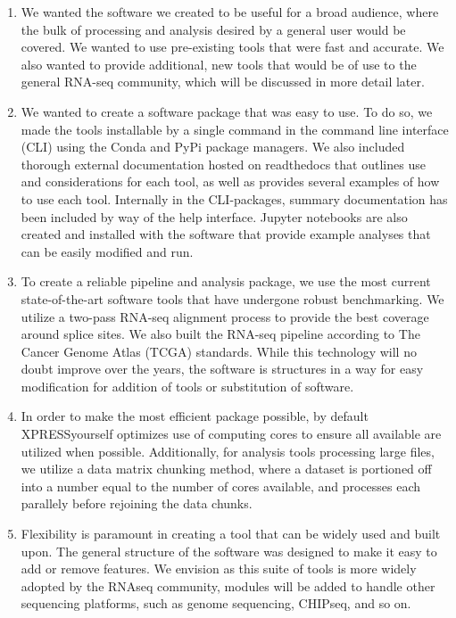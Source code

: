 \documentclass[11pt, a4paper, oneside]{article}
\begin{document}
\begin{enumerate}
  \item We wanted the software we created to be useful for a broad audience, where the bulk of processing and analysis desired by a general user would be covered. We wanted to use pre-existing tools that were fast and accurate. We also wanted to provide additional, new tools that would be of use to the general RNA-seq community, which will be discussed in more detail later.

  \item We wanted to create a software package that was easy to use. To do so, we made the tools installable by a single command in the command line interface (CLI) using the Conda and PyPi package managers. We also included thorough external documentation hosted on readthedocs that outlines use and considerations for each tool, as well as provides several examples of how to use each tool. Internally in the CLI-packages, summary documentation has been included by way of the help interface. Jupyter notebooks are also created and installed with the software that provide example analyses that can be easily modified and run.

  \item To create a reliable pipeline and analysis package, we use the most current state-of-the-art software tools that have undergone robust benchmarking. We utilize a two-pass RNA-seq alignment process to provide the best coverage around splice sites. We also built the RNA-seq pipeline according to The Cancer Genome Atlas (TCGA) standards. While this technology will no doubt improve over the years, the software is structures in a way for easy modification for addition of tools or substitution of software.

  \item In order to make the most efficient package possible, by default XPRESSyourself optimizes use of computing cores to ensure all available are utilized when possible. Additionally, for analysis tools processing large files, we utilize a data matrix chunking method, where a dataset is portioned off into a number equal to the number of cores available, and processes each parallely before rejoining the data chunks.

  \item Flexibility is paramount in creating a tool that can be widely used and built upon. The general structure of the software was designed to make it easy to add or remove features. We envision as this suite of tools is more widely adopted by the RNAseq community, modules will be added to handle other sequencing platforms, such as genome sequencing, CHIPseq, and so on.
\end{enumerate}
\end{document}

